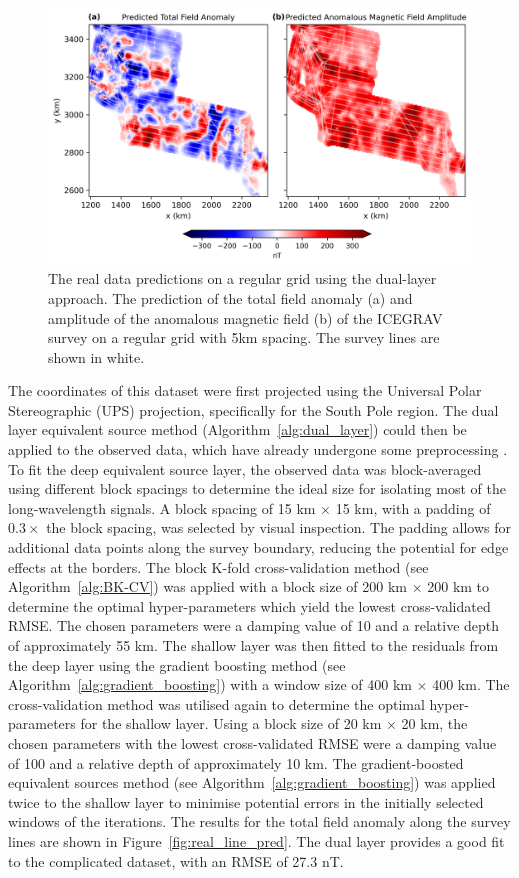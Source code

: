 \begin{figure}[tb!]
\centering
\includegraphics[width=1\linewidth]{paper/figures/real_grid_pred.png}
\caption{
    The real data predictions on a regular grid using the dual-layer approach. The prediction of the total field anomaly (a) and amplitude of the anomalous magnetic field (b) of the ICEGRAV survey \citep{ICEGRAV_data} on a regular grid with 5km spacing. The survey lines are shown in white.
}
\label{fig:real_grid_pred}
\end{figure}

The coordinates of this dataset were first projected using the Universal Polar Stereographic (UPS) projection, specifically for the South Pole region. The dual layer equivalent source method (Algorithm~\ref{alg:dual_layer}) could then be applied to the observed data, which have already undergone some preprocessing \citep{ICEGRAV_data}. To fit the deep equivalent source layer, the observed data was block-averaged using different block spacings to determine the ideal size for isolating most of the long-wavelength signals. A block spacing of 15 km $\times$ 15 km, with a padding of $ 0.3 \times $ the block spacing, was selected by visual inspection. The padding allows for additional data points along the survey boundary, reducing the potential for edge effects at the borders. The block K-fold cross-validation method (see Algorithm~\ref{alg:BK-CV}) was applied with a block size of 200 km $\times$ 200 km to determine the optimal hyper-parameters which yield the lowest cross-validated RMSE. The chosen parameters were a damping value of 10 and a relative depth of approximately 55 km. The shallow layer was then fitted to the residuals from the deep layer using the gradient boosting method (see Algorithm~\ref{alg:gradient_boosting}) with a window size of 400 km $\times$ 400 km. The cross-validation method was utilised again to determine the optimal hyper-parameters for the shallow layer. Using a block size of 20 km $\times$ 20 km, the chosen parameters with the lowest cross-validated RMSE were a damping value of 100 and a relative depth of approximately 10 km. The gradient-boosted equivalent sources method (see Algorithm~\ref{alg:gradient_boosting}) was applied twice to the shallow layer to minimise potential errors in the initially selected windows of the iterations. The results for the total field anomaly along the survey lines are shown in Figure~\ref{fig:real_line_pred}. The dual layer provides a good fit to the complicated dataset, with an RMSE of 27.3 nT.

